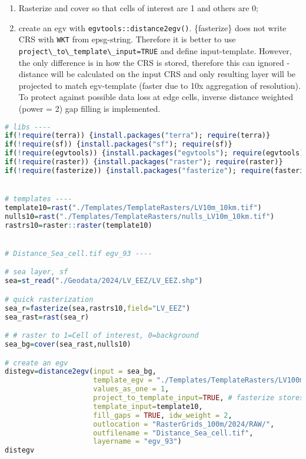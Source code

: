 \documentclass[
]{book}
\newcommand{\passthrough}[1]{#1}
\begin{document}
\begin{enumerate}
\def\labelenumi{\arabic{enumi}.}
\setcounter{enumi}{1}
\item
  Rasterize and cover so that cells of interest are 1 and others are 0;
\item
  create an egv with \passthrough{\lstinline!egvtools::distance2egv()!}. \{fasterize\} does not write CRS
  with \passthrough{\lstinline!WKT!} from epsg-string. Therefore it is better to use \passthrough{\lstinline!project\_to\_template\_input=TRUE!} and
  define input-template. However, the only difference is in how the CRS is stored,
  therefore this can ignored - distance will be calculated on the input CRS and only
  resulting layer will be projected to match egv-template (faster due to 10x aggregation of
  resolution). To protect against possible data loss at edge cells,
  inverse distance weighted (power = 2) gap filling is implemented.
\end{enumerate}

\begin{lstlisting}[language=R]
# libs ----
if(!require(terra)) {install.packages("terra"); require(terra)}
if(!require(sf)) {install.packages("sf"); require(sf)}
if(!require(egvtools)) {install.packages("egvtools"); require(egvtools)}
if(!require(raster)) {install.packages("raster"); require(raster)}
if(!require(fasterize)) {install.packages("fasterize"); require(fasterize)}


# templates ----
template10=rast("./Templates/TemplateRasters/LV10m_10km.tif")
nulls10=rast("./Templates/TemplateRasters/nulls_LV10m_10km.tif")
rastrs10=raster::raster(template10)


# Distance_Sea_cell.tif egv_93 ----

# sea layer, sf
sea=st_read("./Geodata/2024/LV_EEZ/LV_EEZ.shp")

# quick rasterization
sea_r=fasterize(sea,rastrs10,field="LV_EEZ")
sea_rast=rast(sea_r)

# # raster to 1=Cell of interest, 0=background
sea_bg=cover(sea_rast,nulls10)

# create an egv
distegv=distance2egv(input = sea_bg,
                     template_egv = "./Templates/TemplateRasters/LV100m_10km.tif",
                     values_as_one = 1,
                     project_to_template_input=TRUE, # fasterize stores CRS differently
                     template_input=template10,
                     fill_gaps = TRUE, idw_weight = 2,
                     outlocation = "RasterGrids_100m/2024/RAW/",
                     outfilename = "Distance_Sea_cell.tif",
                     layername = "egv_93")
distegv
\end{lstlisting}
\end{document}
